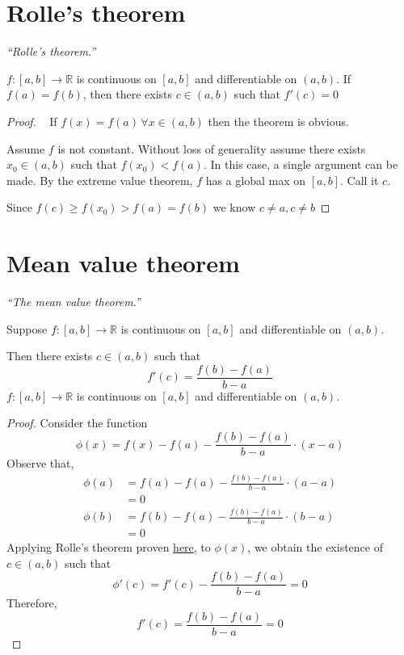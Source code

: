 \documentclass[12pt]{report}
\begin{document}
    \section{Rolle's theorem}
    \label{Rolle's theorem}
    \textit{``Rolle's theorem.''} \vspace{3mm}
    \begin{theorem}
        \(f: [a,b] \to \mathbb{R}\) is continuous on \([a,b]\) and differentiable on \((a,b)\). If \(f(a) = f(b)\), then there exists \(c \in (a,b)\) such that  \(f'(c) = 0\)
    \end{theorem}
    \begin{proof} ~
        If \(f(x) = f(a) \, \forall x \in (a,b)\) then the theorem is obvious.

        Assume \(f\) is not constant. Without loss of generality assume there exists \(x_0 \in (a,b)\) such that \(f(x_0) < f(a)\). In this case, a single argument can be made. By the extreme value theorem, \(f\) has a global max on \([a,b]\). Call it \(c\).

        Since \(f(c) \geq f(x_0) > f(a) = f(b)\) we know \(c \not = a, c \not = b\)
        
    \end{proof} \newpage
    \section{Mean value theorem}
    \label{Mean value theorem}
    \textit{``The mean value theorem.''} \vspace{3mm}
    \begin{theorem}
        Suppose \(f: [a,b] \to \mathbb{R}\) is continuous on \([a,b]\) and differentiable on \((a,b)\).

        Then there exists \(c \in (a,b)\) such that
        \[f'(c) = \frac{f(b) - f(a)}{b-a}\]\(f: [a,b] \to \mathbb{R}\) is continuous on \([a,b]\) and differentiable on \((a,b)\).

    \end{theorem}
    \begin{proof}
        Consider the function   
        \[\phi (x) = f(x) - f(a) - \frac{f(b) - f(a)}{b-a} \cdot (x-a)\]
        Observe that,
        \begin{align*}
            \phi (a) &= f(a) - f(a) - \frac{f(b) - f(a)}{b-a} \cdot (a-a)\\
            &= 0\\
            \phi (b) &= f(b) - f(a) - \frac{f(b) - f(a)}{b-a} \cdot (b-a)\\
            &= 0
        \end{align*}
        Applying Rolle's theorem proven \hyperref[Rolle's theorem]{here}, to \(\phi (x)\), we obtain the existence of \(c \in (a,b)\) such that
        \[\phi ' (c) = f'(c) - \frac{f(b)- f(a)}{b-a} = 0\]
        Therefore,
        \[f'(c) = \frac{f(b)- f(a)}{b-a} = 0\]
    \end{proof}\newpage
\end{document}
